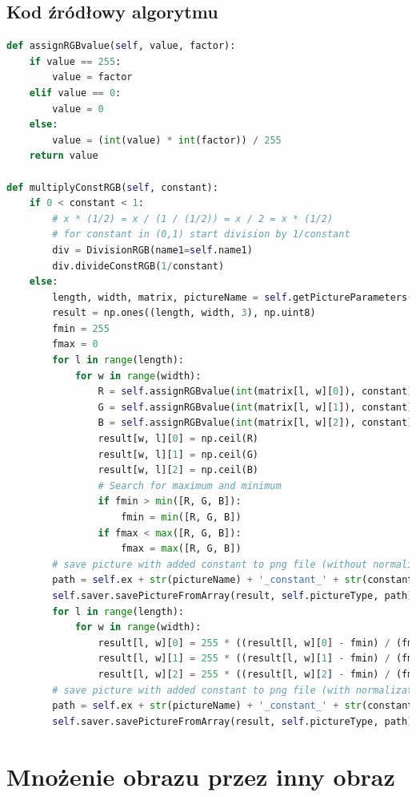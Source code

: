 \documentclass[a4paper,12pt, titlepage]{report}
\begin{document}
\subsection*{Kod źródłowy algorytmu}
\begin{lstlisting}[language=Python]
def assignRGBvalue(self, value, factor):
    if value == 255:
        value = factor
    elif value == 0:
        value = 0
    else:
        value = (int(value) * int(factor)) / 255
    return value

def multiplyConstRGB(self, constant):
    if 0 < constant < 1:
        # x * (1/2) = x / (1 / (1/2)) = x / 2 = x * (1/2)
        # for constant in (0,1) start division by 1/constant
        div = DivisionRGB(name1=self.name1)
        div.divideConstRGB(1/constant)
    else:
        length, width, matrix, pictureName = self.getPictureParameters(self.pic1)
        result = np.ones((length, width, 3), np.uint8)
        fmin = 255
        fmax = 0
        for l in range(length):
            for w in range(width):
                R = self.assignRGBvalue(int(matrix[l, w][0]), constant)
                G = self.assignRGBvalue(int(matrix[l, w][1]), constant)
                B = self.assignRGBvalue(int(matrix[l, w][2]), constant)
                result[w, l][0] = np.ceil(R)
                result[w, l][1] = np.ceil(G)
                result[w, l][2] = np.ceil(B)
                # Search for maximum and minimum
                if fmin > min([R, G, B]):
                    fmin = min([R, G, B])
                if fmax < max([R, G, B]):
                    fmax = max([R, G, B])
        # save picture with added constant to png file (without normalization)
        path = self.ex + str(pictureName) + '_constant_' + str(constant) + '.png'
        self.saver.savePictureFromArray(result, self.pictureType, path)
        for l in range(length):
            for w in range(width):
                result[l, w][0] = 255 * ((result[l, w][0] - fmin) / (fmax - fmin))
                result[l, w][1] = 255 * ((result[l, w][1] - fmin) / (fmax - fmin))
                result[l, w][2] = 255 * ((result[l, w][2] - fmin) / (fmax - fmin))
        # save picture with added constant to png file (with normalization)
        path = self.ex + str(pictureName) + '_constant_' + str(constant) + '_normalized.png'
        self.saver.savePictureFromArray(result, self.pictureType, path)
\end{lstlisting}

\section{Mnożenie obrazu przez inny obraz}
\end{document}
